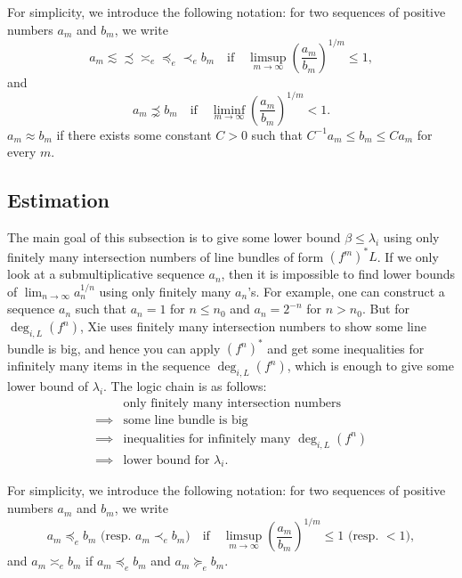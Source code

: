     
  For simplicity, we introduce the following notation: for two sequences of positive numbers $a_m$ and $b_m$, we write 
  \[ a_m \lesssim \precsim \asymp_e \preccurlyeq_e \prec_e  b_m \quad \text{if} \quad \limsup_{m \to \infty} \left(\frac{a_m}{b_m}\right)^{1/m} \leq 1, \]
  and\Yang{}
  \[ a_m \precnsim b_m \quad \text{if} \quad \liminf_{m \to \infty} \left(\frac{a_m}{b_m}\right)^{1/m} < 1. \]
  $a_m \approx b_m$ if there exists some constant $C > 0$ such that $C^{-1} a_m \leq b_m \leq C a_m$ for every $m$.\Yang{}







\subsection{Estimation}

  The main goal of this subsection is to give some lower bound $\beta \leq \lambda_i$ using only finitely many intersection numbers of line bundles of form $(f^m)^* L$.
  If we only look at a submultiplicative sequence $a_n$, then it is impossible to find lower bounds of $\lim_{n \to \infty} a_n^{1/n}$ using only finitely many $a_n$'s.
  For example, one can construct a sequence $a_n$ such that $a_n = 1$ for $n \leq n_0$ and $a_n = 2^{-n}$ for $n > n_0$.
  But for $\deg_{i,L}(f^n)$, Xie uses finitely many intersection numbers to show some line bundle is big, and hence you can apply $(f^n)^*$ and get some inequalities for infinitely many items in the sequence $\deg_{i,L}(f^n)$, which is enough to give some lower bound of $\lambda_i$.
  The logic chain is as follows:
  \begin{align*}
    &\text{only finitely many intersection numbers} \\
    \implies &\text{some line bundle is big} \\
    \implies &\text{inequalities for infinitely many } \deg_{i,L}(f^n) \\
    \implies &\text{lower bound for } \lambda_i.
  \end{align*}

  \begin{notation}
    For simplicity, we introduce the following notation: for two sequences of positive numbers $a_m$ and $b_m$, we write
    \[ a_m \preccurlyeq_e b_m \text{ (resp. $a_m \prec_e b_m$)}  \quad \text{if} \quad \limsup_{m \to \infty} \left(\frac{a_m}{b_m}\right)^{1/m} \leq 1 \text{ (resp. } < 1), \]
    and $a_m \asymp_e b_m$ if $a_m \preccurlyeq_e b_m$ and $a_m \succcurlyeq_e b_m$.
  \end{notation}

